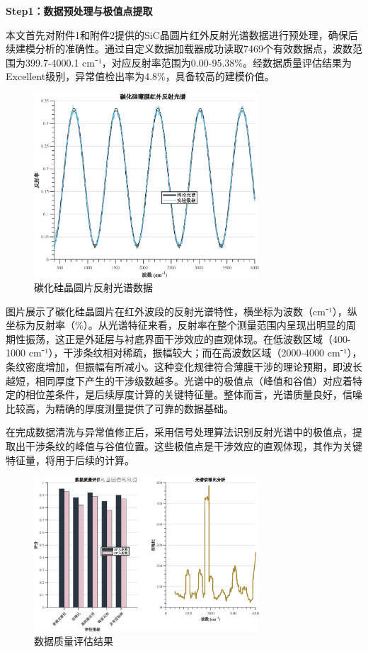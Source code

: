 \documentclass[withoutpreface,bwprint]{cumcmthesis}
\begin{document}
\textbf{Step1：数据预处理与极值点提取} 

本文首先对附件1和附件2提供的SiC晶圆片红外反射光谱数据进行预处理，确保后续建模分析的准确性。通过自定义数据加载器成功读取7469个有效数据点，波数范围为399.7-4000.1 cm⁻¹，对应反射率范围为0.00-95.38\%。经数据质量评估结果为Excellent级别，异常值检出率为4.8\%，具备较高的建模价值。

\begin{figure}[H]
\centering
\includegraphics[width=0.75\textwidth]{figures/reflectance_spectrum.eps}
\caption{碳化硅晶圆片反射光谱数据}
\label{fig:反射光谱数据}
\end{figure}

图片展示了碳化硅晶圆片在红外波段的反射光谱特性，横坐标为波数（cm⁻¹），纵坐标为反射率（\%）。从光谱特征来看，反射率在整个测量范围内呈现出明显的周期性振荡，这正是外延层与衬底界面干涉效应的直观体现。在低波数区域（400-1000 cm⁻¹），干涉条纹相对稀疏，振幅较大；而在高波数区域（2000-4000 cm⁻¹），条纹密度增加，但振幅有所减小。这种变化规律符合薄膜干涉的理论预期，即波长越短，相同厚度下产生的干涉级数越多。光谱中的极值点（峰值和谷值）对应着特定的相位差条件，是后续厚度计算的关键特征量。整体而言，光谱质量良好，信噪比较高，为精确的厚度测量提供了可靠的数据基础。

在完成数据清洗与异常值修正后，采用信号处理算法识别反射光谱中的极值点，提取出干涉条纹的峰值与谷值位置。这些极值点是干涉效应的直观体现，其作为关键特征量，将用于后续的计算。

\begin{figure}[H]
\centering
\includegraphics[width=0.75\textwidth]{figures/data_quality.eps}
\caption{数据质量评估结果}
\label{fig:数据质量评估}
\end{figure}
\end{document}
